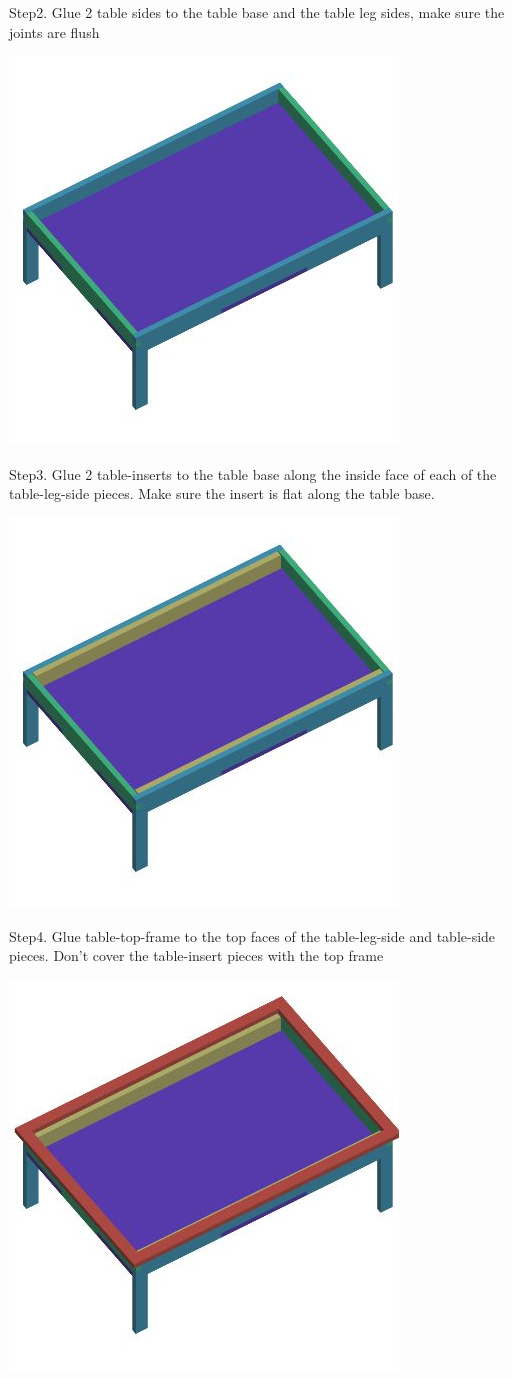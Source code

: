 \documentclass[]{article}
\begin{document}
		Step2. Glue 2 table sides to the table base and the table leg sides, make sure the joints are flush

		\includegraphics[width=0.5\linewidth]{img/jpg/table-2.jpg}		
		
		\newpage
		
		Step3. Glue 2 table-inserts to the table base along the inside face of each of the table-leg-side pieces. Make sure the insert is flat along the table base.

		\includegraphics[width=0.5\linewidth]{img/jpg/table-3.jpg}	
		
		Step4. Glue table-top-frame to the top faces of the table-leg-side and table-side pieces. Don't cover the table-insert pieces with the top frame

		\includegraphics[width=0.5\linewidth]{img/jpg/table-4.jpg}	
		
\end{document}
